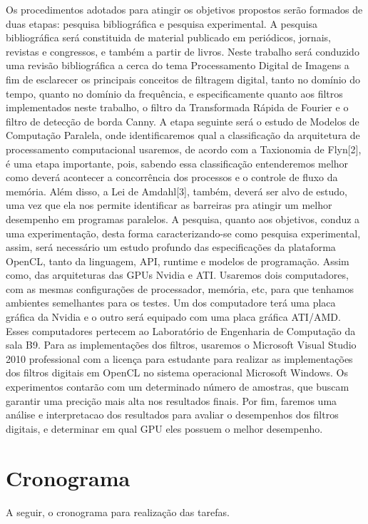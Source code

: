 Os procedimentos adotados para atingir os objetivos propostos serão formados de duas etapas: pesquisa bibliográfica e pesquisa experimental. A pesquisa bibliográfica será constituida de material publicado em periódicos, jornais, revistas e congressos, e também a partir de livros. Neste trabalho será conduzido uma revisão bibliográfica a cerca do tema Processamento Digital de Imagens a fim de esclarecer os principais conceitos de filtragem digital, tanto no domínio do tempo, quanto no domínio da frequência, e especificamente quanto aos filtros implementados neste trabalho, o filtro da Transformada Rápida de Fourier e o filtro de detecção de borda Canny.
A etapa seguinte será o estudo de Modelos de Computação Paralela, onde identificaremos qual a classificação da arquitetura de processamento computacional usaremos, de acordo com a Taxionomia de Flyn[2], é uma etapa importante, pois, sabendo essa classificação entenderemos melhor como deverá acontecer a concorrência dos processos e o controle de fluxo da memória. Além disso, a Lei de Amdahl[3], também, deverá ser alvo de estudo, uma vez que ela nos permite identificar as barreiras pra atingir um melhor desempenho em programas paralelos.
A pesquisa, quanto aos objetivos, conduz a uma experimentação, desta forma caracterizando-se como pesquisa experimental, assim, será necessário um estudo profundo das especificações da plataforma OpenCL, tanto da linguagem, API, runtime e modelos de programação. Assim como, das arquiteturas das GPUs Nvidia e ATI. Usaremos dois computadores, com as mesmas configurações de processador, memória, etc, para que tenhamos ambientes semelhantes para os testes. Um dos computadore terá uma placa gráfica da Nvidia e o outro será equipado com uma placa gráfica ATI/AMD. Esses computadores pertecem ao Laboratório de Engenharia de Computação da sala B9.
Para as implementações dos filtros, usaremos o Microsoft Visual Studio 2010 professional com a licença para estudante para realizar as implementações dos filtros digitais em OpenCL no sistema operacional Microsoft Windows. Os experimentos contarão com um determinado número de amostras, que buscam garantir uma precição mais alta nos resultados finais.  Por fim, faremos uma análise e interpretacao dos resultados para avaliar o desempenhos dos filtros digitais, e determinar em qual GPU eles possuem o melhor desempenho.


\section{Cronograma}
A seguir, o cronograma para realização das tarefas.


